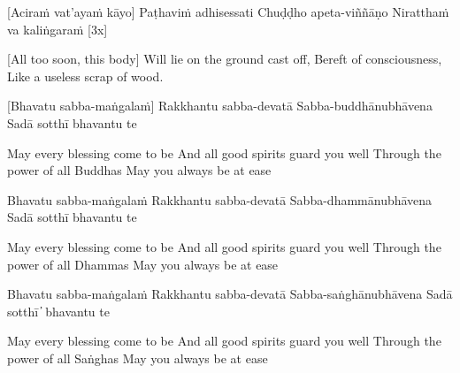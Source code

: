 \suttaRef{[Thai]}

[Aciraṁ vat’ayaṁ kāyo]
Paṭhaviṁ adhisessati
Chuḍḍho apeta-viññāṇo
Niratthaṁ va kaliṅgaraṁ [3x]

\begin{english}
  [All too soon, this body]
  Will lie on the ground cast off,
  Bereft of consciousness,
  Like a useless scrap of wood.
\end{english}

\suttaRef{[Dhp 41]}

[Bhavatu sabba-maṅgalaṁ]
Rakkhantu sabba-devatā
Sabba-buddhānubhāvena
Sadā sotthī bhavantu te

\begin{english}
  May every blessing come to be
  And all good spirits guard you well
  Through the power of all Buddhas
  May you always be at ease
\end{english}

Bhavatu sabba-maṅgalaṁ
Rakkhantu sabba-devatā
Sabba-dhammānubhāvena
Sadā sotthī bhavantu te

\begin{english}
  May every blessing come to be
  And all good spirits guard you well
  Through the power of all Dhammas
  May you always be at ease
\end{english}

Bhavatu sabba-maṅgalaṁ
Rakkhantu sabba-devatā
Sabba-saṅghānubhāvena
Sadā sotthī  ̓  bhavantu te

\begin{english}
  May every blessing come to be
  And all good spirits guard you well
  Through the power of all Saṅghas
  May you always be at ease
\end{english}
